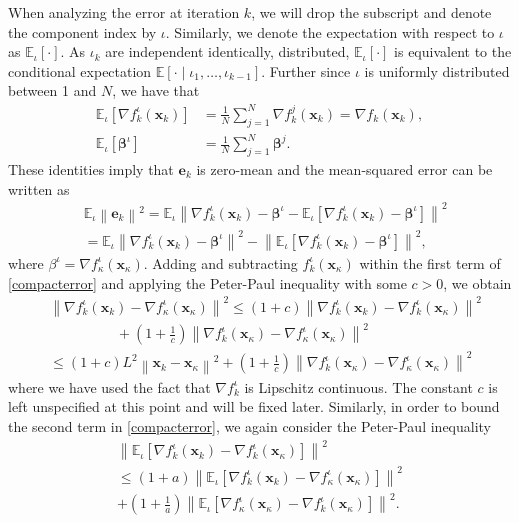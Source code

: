 \documentclass[draftcls,onecolumn,12pt]{IEEEtran}
\theoremstyle{plain}
\def\x{\mathbf{x}}
\def\e{\mathbf{e}}
\def\bt{\boldsymbol{\beta}}
\def\EE{\mathbb{E}}
\providecommand{\norm}[1]{\left\|#1\right\|}
\theoremstyle{plain}
\theoremstyle{remark}
\begin{document}
When analyzing the error at iteration $k$, we will drop the subscript and denote the component index by $\iota$. Similarly, we denote the expectation with respect to $\iota$ as $\EE_\iota[\cdot]$. As $\iota_k$ are independent identically, distributed, $\EE_{\iota}[\cdot]$ is equivalent to the conditional expectation $\EE[\cdot \mid \iota_1, \ldots, \iota_{k-1}]$. Further since $\iota$ is uniformly distributed between 1  and $N$, we have that
\begin{align}
\EE_{\iota}\left[\nabla f_k^\iota(\x_k)\right] &= \frac{1}{N}\sum_{j=1}^N \nabla f_k^j(\x_k) = \nabla f_k(\x_k),\\
\EE_{\iota}[\bt^\iota] &= \frac{1}{N}\sum_{j=1}^N \bt^j .
\end{align}
These identities imply that $\e_k$ is zero-mean and the mean-squared error can be written as
\begin{align}
&\EE_{\iota}\norm{\e_k}^2 = \EE_{\iota}\norm{\nabla f_k^{\iota}(\x_k)-\bt^{\iota} - \EE_{\iota}[\nabla f_k^{\iota}(\x_k)-\bt^{\iota}]}^2 \\
&=\EE_{\iota}\norm{\nabla f_k^{\iota}(\x_k)-\bt^{\iota}}^2 -\norm{\EE_{\iota}[\nabla f_k^{\iota}(\x_k)-\bt^{\iota}]}^2 \label{compacterror},
\end{align}
where $\beta^\iota = \nabla f_\kappa^\iota(\x_\kappa)$. Adding and subtracting $f_k^\iota(\x_\kappa)$ within the first term of \eqref{compacterror} and applying the Peter-Paul inequality with some $c > 0$, we obtain
\begin{align}
&\norm{\nabla f_k^{\iota}(\x_k)-\nabla f_{\kappa}^{\iota}(\x_{\kappa})}^2 
 \leq  (1+ c)\norm{\nabla f_k^{\iota}(\x_k)-\nabla f_k^{\iota}(\x_{\kappa})}^2\nonumber \\ &\hspace{2cm}+(1+\tfrac{1}{c})\norm{\nabla f_k^{\iota}(\x_{\kappa})-\nabla f_{\kappa}^{\iota}(\x_{\kappa})}^2 \nonumber \\
& \leq \!\! (1\!+\!c)L^2\norm{\x_k\!-\!\x_{\kappa}}^2\!\!\!+\!(1\!\!+\!\!\tfrac{1}{c})\norm{\nabla f_k^{\iota}(\x_{\kappa})\!-\!\nabla f_{\kappa}^{\iota}(\x_{\kappa})}^2  \label{firsterrorbound} 
\end{align}
where we have used the fact that $\nabla f_k^\iota$ is Lipschitz continuous. The constant $c$ is left unspecified at this point and will be fixed later. Similarly, in order to bound the second term in \eqref{compacterror}, we again consider the Peter-Paul inequality
\begin{multline}
\norm{\EE_{\iota}[\nabla f_k^{\iota}(\x_k)-\nabla f_{k}^{\iota}(\x_{\kappa})]}^2 \\
\leq 	(1+a)\norm{\EE_{\iota}[\nabla f_k^{\iota}(\x_k)-\nabla f_{\kappa}^{\iota}(\x_{\kappa})]}^2  \\
+(1+\tfrac{1}{a})\norm{\EE_{\iota}[\nabla f_{\kappa}^{\iota}(\x_{\kappa})-\nabla f_k^{\iota}(\x_{\kappa})]}^2.  
\end{multline}
\end{document}
